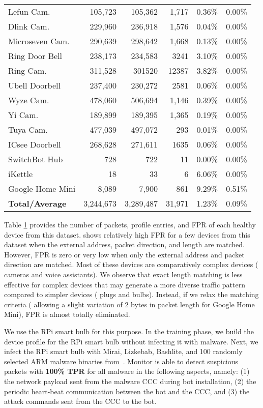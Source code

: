 \begin{table}[t!]
\begin{tabularx}{\linewidth}{p{15mm} r r r r r}
Lefun Cam. & 105,723 & 105,362 & 1,717 & 0.36\% & 0.00\%\\ 
Dlink Cam. & 229,960 & 236,918 & 1,576 & 0.04\% & 0.00\%\\ 
Microseven Cam. & 290,639 & 298,642 & 1,668 & 0.13\% & 0.00\%\\ 
Ring Door Bell & 238,173 & 234,583 & 3241 & 3.10\% & 0.00\% \\ 
Ring Cam. & 311,528 & 301520 & 12387 & 3.82\% & 0.00\% \\ 
Ubell Doorbell & 237,400 & 230,272 & 2581 & 0.06\% & 0.00\% \\ 
Wyze Cam. & 478,060 & 506,694 & 1,146 & 0.39\% & 0.00\% \\ 
Yi Cam. & 189,899 & 189,395 & 1,365 & 0.19\% & 0.00\% \\
Tuya Cam. & 477,039 & 497,072 & 293 & 0.01\% & 0.00\% \\
ICsee Doorbell & 268,628 & 271,611 & 1635 & 0.06\% & 0.00\% \\ 
SwitchBot Hub & 728 & 722 & 11 & 0.00\% & 0.00\% \\ 
iKettle & 18 & 33 & 6 & 6.06\% & 0.00\% \\
Google Home Mini & 8,089 & 7,900 & 861 & 9.29\% & 0.51\% \\
\midrule
\textbf{Total/Average} & 3,244,673
& 3,289,487 & 31,971 & 1.23\% & 0.09\% \\
\bottomrule
\end{tabularx}
\vspace{-1em}
\label{tab:device false positive behavIot}
\end{table}

Table \ref{tab:device false positive behavIot} provides the number of packets, profile entries, and FPR of each healthy device from this dataset.
\system{} shows relatively high FPR for a few devices from this dataset when the external address, packet direction, and length are matched. However, FPR is zero or very low when only the external address and packet direction are matched. Most of these devices are comparatively complex devices (\eg{} cameras and voice assistants). We observe that exact length matching is less effective for complex devices that may generate a more diverse traffic pattern compared to simpler devices (\eg{} plugs and bulbs). Instead, if we relax the matching criteria (\eg{} allowing a slight variation of 2 bytes in packet length for Google Home Mini), FPR is almost totally eliminated.

We use the RPi smart bulb for this purpose. In the training phase, we build the device profile for the RPi smart bulb without infecting it with malware. Next, we infect the RPi smart bulb with Mirai, Lizkebab, Bashlite, and 100 randomly selected ARM malware binaries from~\cite{alrawi2021circle}. Monitor is able to detect suspicious packets with \textbf{100\% TPR} for all malware in the following aspects, namely: (1) the network payload sent from the malware CCC during bot installation, (2) the periodic heart-beat communication between the bot and the CCC, and (3) the attack commands sent from the CCC to the bot.

